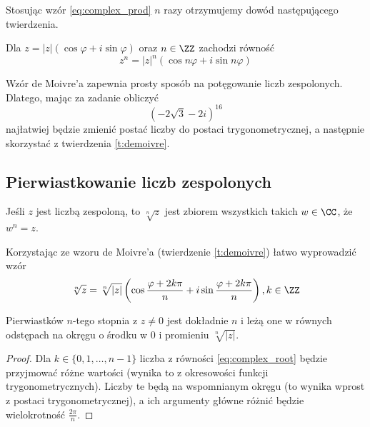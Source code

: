 Stosując wzór \ref{eq:complex_prod} $n$ razy otrzymujemy dowód następującego twierdzenia.

\begin{theorem}
    \label{t:demoivre}
    Dla $z = |z|(\cos\varphi + i\sin\varphi)$ oraz $n \in \ZZ$ zachodzi równość
    $$ z^n = |z|^n(\cos n\varphi + i\sin n\varphi) $$
\end{theorem}

Wzór de Moivre'a zapewnia prosty sposób na potęgowanie liczb zespolonych. Dlatego, mając za zadanie obliczyć
$$ (-2\sqrt{3} - 2i)^{16} $$
najłatwiej będzie zmienić postać liczby do postaci trygonometrycznej, a następnie skorzystać z twierdzenia \ref{t:demoivre}.

\subsection{Pierwiastkowanie liczb zespolonych}
\begin{definition}
    Jeśli $z$ jest liczbą zespoloną, to $\sqrt[n]{z}$ jest zbiorem wszystkich takich $w \in \CC$, że $w^n = z$.
\end{definition}

Korzystając ze wzoru de Moivre'a (twierdzenie \ref{t:demoivre}) łatwo wyprowadzić wzór
\begin{equation}
    \label{eq:complex_root}
    \sqrt[n]{z} = \sqrt[n]{|z|}\left(\cos\frac{\varphi + 2k\pi}{n} + i\sin\frac{\varphi + 2k\pi}{n}\right), k \in \ZZ
\end{equation}

\begin{fact}
    Pierwiastków $n$-tego stopnia z $z \neq 0$ jest dokładnie $n$ i leżą one w równych odstępach na okręgu o środku w $0$ i promieniu $\sqrt[n]{|z|}$.
\end{fact}
\begin{proof}
    Dla $k \in \{0, 1, \ldots, n-1\}$ liczba z równości \ref{eq:complex_root} będzie przyjmować różne wartości (wynika to z okresowości funkcji trygonometrycznych). Liczby te będą na wspomnianym okręgu (to wynika wprost z postaci trygonometrycznej), a ich argumenty główne różnić będzie wielokrotność $\frac{2\pi}{n}$.
\end{proof}

